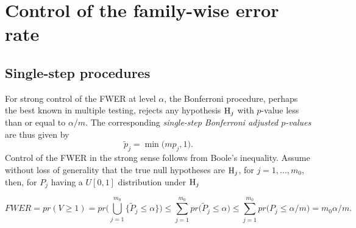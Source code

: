 \documentclass[11pt]{article}
\begin{document}

\section{Control of the family-wise error rate}\label{sFWER}

\subsection{Single-step procedures}

For strong control of the FWER at level $\alpha$, the Bonferroni
procedure, perhaps the best known in multiple testing, rejects any
hypothesis ${\rm H}_j$ with $p$-value less than or equal to $\alpha/m$. The corresponding {\it single-step
  Bonferroni adjusted $p$-values} are thus given by 
\begin{equation}\label{ebs}
\tilde{p}_j = \min \bigl( mp_j,1 \bigr).
\end{equation}
Control of the FWER in the strong sense follows from Boole's
inequality. Assume without loss of generality that the true null
hypotheses are ${\rm H}_j$, for $j=1,\ldots,m_0$, then, for  $P_j$
having a $U[0,1]$ distribution under ${\rm H}_j$


$$ FWER = pr(V \geq 1) = pr\bigl (\bigcup_{j=1}^{m_0} \{ \tilde{P}_j
\leq \alpha \} \bigr) \leq \sum_{j=1}^{m_0} pr\bigl (\tilde{P}_j \leq
\alpha \bigr) \leq  \sum_{j=1}^{m_0} pr\bigl (P_j \leq \alpha/m \bigr) = m_0 \alpha/m.$$
\end{document}
